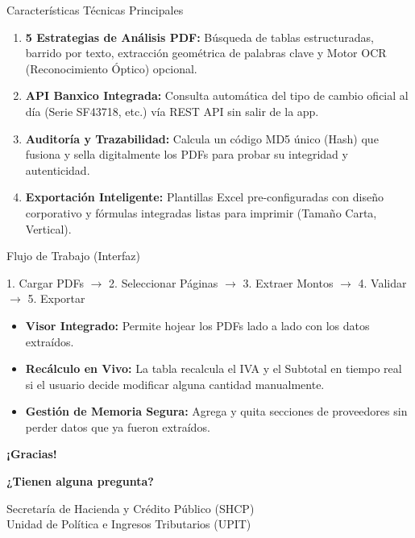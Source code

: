 \documentclass[aspectratio=169, 11pt]{beamer}
\begin{document}
\begin{frame}{Características Técnicas Principales}
    \begin{enumerate}[<+->]
        \item \textbf{5 Estrategias de Análisis PDF:} Búsqueda de tablas estructuradas, barrido por texto, extracción geométrica de palabras clave y Motor OCR (Reconocimiento Óptico) opcional.
        \item \textbf{API Banxico Integrada:} Consulta automática del tipo de cambio oficial al día (Serie SF43718, etc.) vía REST API sin salir de la app.
        \item \textbf{Auditoría y Trazabilidad:} Calcula un código MD5 único (Hash) que fusiona y sella digitalmente los PDFs para probar su integridad y autenticidad.
        \item \textbf{Exportación Inteligente:} Plantillas Excel pre-configuradas con diseño corporativo y fórmulas integradas listas para imprimir (Tamaño Carta, Vertical).
    \end{enumerate}
\end{frame}

\begin{frame}{Flujo de Trabajo (Interfaz)}
    \begin{center}
        \colorbox{vino}{\color{white} 1. Cargar PDFs} $\rightarrow$
        \colorbox{vino}{\color{white} 2. Seleccionar Páginas} $\rightarrow$
        \colorbox{vino}{\color{white} 3. Extraer Montos} $\rightarrow$
        \colorbox{vino}{\color{white} 4. Validar} $\rightarrow$
        \colorbox{vino}{\color{white} 5. Exportar}
    \end{center}
    \vspace{0.4cm}
    \begin{itemize}
        \item \textbf{Visor Integrado:} Permite hojear los PDFs lado a lado con los datos extraídos.
        \item \textbf{Recálculo en Vivo:} La tabla recalcula el IVA y el Subtotal en tiempo real si el usuario decide modificar alguna cantidad manualmente.
        \item \textbf{Gestión de Memoria Segura:} Agrega y quita secciones de proveedores sin perder datos que ya fueron extraídos.
    \end{itemize}
\end{frame}

\begin{frame}
    \begin{center}
        \Huge \textcolor{vino}{\textbf{¡Gracias!}}
        
        \vspace{1cm}
        \Large \textbf{¿Tienen alguna pregunta?}
        
        \vspace{1cm}
        \normalsize Secretaría de Hacienda y Crédito Público (SHCP)\\
        Unidad de Política e Ingresos Tributarios (UPIT)
    \end{center}
\end{frame}
\end{document}
